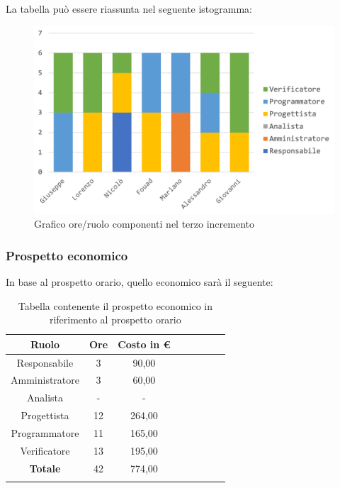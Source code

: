 		La tabella può essere riassunta nel seguente istogramma:
		\begin{figure}[H]
			\centering
			\includegraphics[width=0.8\linewidth]{./images/preventivo/incremento3-1.png}
			\caption{Grafico ore/ruolo componenti nel terzo incremento}
			\label{fig:grafico suddivione ruoli incremento III}
		\end{figure}
		
		\subsubsection{Prospetto economico}
		In base al prospetto orario, quello economico sarà il seguente: 
		
		\begin{longtable}{|c|c|c|c|c|c|c|c|}
			\hline
			\rowcolor{lighter-grayer}
			\textbf{Ruolo} & \textbf{Ore} & \textbf{Costo in € } \\
			\hline
			\endfirsthead
			
			\hline
			Responsabile 	    & 3 & 90,00\\
			\hline 
			\hline
			Amministratore	   & 3 & 60,00\\
			\hline
			\hline
			Analista 				& - & -\\
			\hline
			\hline
			Progettista 		   & 12 & 264,00\\
			\hline
			\hline
			Programmatore 	  & 11 & 165,00\\
			\hline
			\hline
			Verificatore 		   & 13 & 195,00\\
			\hline
			\textbf{Totale} 	 & 42 & 774,00\\
			\hline
			\caption{Tabella contenente il prospetto economico in riferimento al prospetto orario}
		\end{longtable}
		\pagebreak
		
